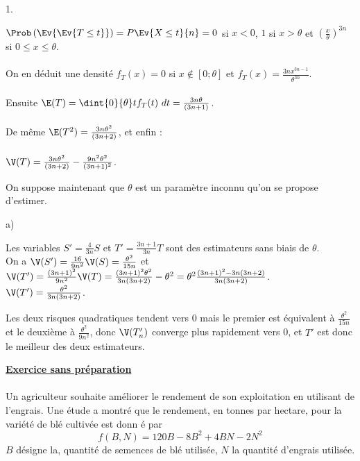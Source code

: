 \documentclass[11pt]{article}%
\begin{document}
\begin{exercice}
\begin{noliste}{1.}
 \item $\Prob\left(\Ev{\Ev{ T \leq t}}\right) = P \Ev{ X \leq t}{n} =
0$ si $x <0$, $1$ si $x > \theta$ et $\left( \frac{x}{\theta}
\right)^{3n}$ si $0 \leq x \leq \theta$. \\
\\
 On en déduit une densité $f_{T}(x) = 0$ si $x \notin [0 ; \theta]$ et
$f_{T}(x) = \frac{3n x^{3n-1} }{ \theta^{3n} }$. \\
\\
 Ensuite $\E(T) = \dint{0}{\theta} t f_{T}(t)\ dt = \frac{3n \theta
}{(3n + 1) }$. \\
\\
 De même $\E(T^{2}) = \frac{3 n \theta^{2} }{ (3n + 2) }$, et enfin :
\\
\\
 $\V(T) = \frac{3n \theta^{2} }{ (3n + 2) } - \frac{9 n^{2} \theta^{2}
}{ (3n + 1)^{2} }$. \\

 \item On suppose maintenant que $\theta $ est un paramètre inconnu
qu'on
 se propose d'estimer.

 \begin{noliste}{a)}
 \setlength{\itemsep}{2mm}
 \item Les variables $S' = \frac{4}{3n} S$ et $T' = \frac{3n + 1}{3n}
T$ sont des estimateurs sans biais de $\theta$. \\
 On a $\V(S') = \frac{16}{9 n^{2}} \V(S) = \frac{\theta^{2}}{15 n}$ et
$\V(T') = \frac{(3n + 1)^{2}}{9 n^{2}} \V(T) = \frac{ (3n + 1)^{2}
\theta^{2} }{ 3n (3n + 2) } - \theta^{2} = \theta^{2} \frac{(3n +
1)^{2} - 3n (3n + 2) }{3n (3n + 2)}$. \\
 $\V(T') = \frac{ \theta^{2}}{3n (3n + 2)}$. \\

 \item Les deux risques quadratiques tendent vers 0 mais le premier est
équivalent à $\frac{\theta^{2}}{15 n}$ et le deuxième à
$\frac{\theta^{2}}{ 9 n^{2}}$, donc $\V(T_{n}')$ converge plus
rapidement vers 0, et $T'$ est donc le meilleur des deux estimateurs.
 \end{noliste}
 \end{noliste}

 

 \noindent \textbf{\underline{Exercice sans préparation}} \\
\\
 Un agriculteur souhaite améliorer le rendement de son exploitation en
 utilisant de l'engrais. Une étude a montré que le rendement, en
 tonnes par hectare, pour la variété de blé cultivée est donn é par 
\[
 f\left( B,N\right) = 120B-8B^{2} + 4BN-2N^{2} 
\]
 $B$ désigne la, quantité de semences de blé utilisée, $N$ la
 quantité d'engrais utilisée.


\end{exercice}
\end{document}
